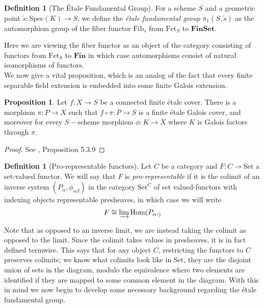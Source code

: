\documentclass{article}
\theoremstyle{definition}
\newtheorem{proposition}[theorem]{Proposition}
\newtheorem{definition}[theorem]{Definition}
\theoremstyle{remark}
\begin{document}
\begin{definition}[The \'Etale Fundamental Group]
	For a scheme $S$ and a geometric point $\widetilde{s}: \text{Spec}(K) \to S$, we define the \textit{\'etale fundamental group} $\pi_1(S, \widetilde{s})$ as the automorphism group of the fiber functor $\text{Fib}_{\overline{s}}$ from $\text{Fet}_{S}$ to $\textbf{FinSet}$.
\end{definition}

Here we are viewing the fiber functor as an object of the category consisting of functors from $\text{Fet}_S$ to $\textbf{Fin}$ in which case automorphisms consist of natural isomorphisms of functors.\\

We now give a vital proposition, which is an analog of the fact that every finite separable field extension is embedded into some finite Galois extension.  


\begin{proposition}
	Let $f: X \to S$ be a connected finite \'etale cover. 
	There is a morphism $\pi: P \to X$ such that $f \circ \pi: P \to S$ is a finite \'etale Galois cover, and moreover for every $S-$scheme morphism $\phi:K  \to X$ where $K$ is Galois factors through $\pi$.
\end{proposition}

\begin{proof}
	See \cite{Szamuely}, Proposition 5.3.9
\end{proof}

\begin{definition}[Pro-representable functors]
	Let $C$ be a category and $F: C \to \text{Set}$ a set-valued functor.
	We will say that $F$ is \textit{pro-representable} if it is the colimit of an inverse system $(P_{\alpha}, \phi_{\alpha \beta})$ in the category $\text{Set}^C$ of set valued-functors with indexing objects representable presheaves, in which case we will write 
	\[F \cong \varinjlim \text{Hom}(P_{\alpha}, _)\]
\end{definition} 

Note that as opposed to an inverse limit, we are instead taking the colimit as opposed to the limit.
Since the colimit takes values in presheaves, it is in fact defined termwise.
This says that for any object $C$, restricting the functors to $C$ preserves colimits; we know what colimits look like in Set, they are the disjoint union of sets in the diagram, modulo the equivalence where two elements are identified if they are mapped to some common element in the diagram. 
With this in mind we now begin to develop some necessary background regarding the \'etale fundamental group.
\end{document}
